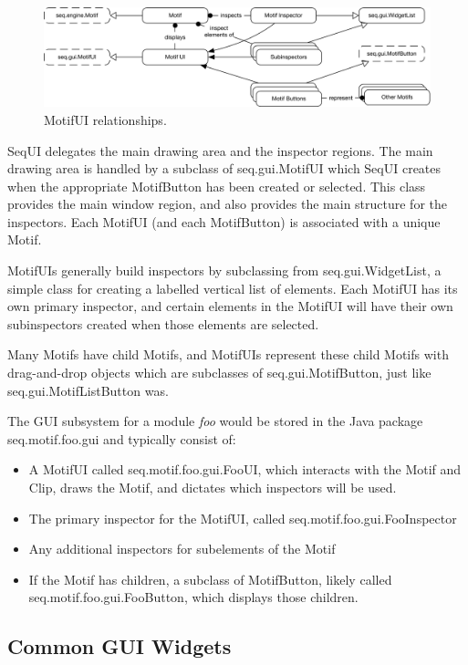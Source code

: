 \documentclass[twoside,10pt]{article}
\begin{document}
\begin{figure}[t]
\centering
\includegraphics[width=5in]{inspectors}
\caption{MotifUI relationships.}
\label{inspectorsdev}
\end{figure}

SeqUI delegates the main drawing area and the inspector regions.  The main drawing area is handled by a subclass of {\sf seq.gui.MotifUI} which SeqUI creates when the appropriate MotifButton has been created or selected.  This class provides the main window region, and also provides the main structure for the inspectors.  Each MotifUI (and each MotifButton) is associated with a unique Motif.

MotifUIs generally build inspectors by subclassing from {\sf seq.gui.WidgetList}, a simple class for creating a labelled vertical list of elements.  Each MotifUI has its own primary inspector, and certain elements in the MotifUI will have their own subinspectors created when those elements are selected. 

Many Motifs have child Motifs, and MotifUIs represent these child Motifs with drag-and-drop objects which are subclasses of {\sf seq.gui.MotifButton}, just like {\sf seq.gui.MotifListButton} was.

The GUI subsystem for a module {\it foo} would be stored in the Java package {\sf seq.motif.foo.gui} and typically consist of:

\begin{itemize}
\item A MotifUI called {\sf seq.motif.foo.gui.FooUI}, which interacts with the Motif and Clip, draws the Motif, and dictates which inspectors will be used.
\item The primary inspector for the MotifUI, called {\sf seq.motif.foo.gui.FooInspector}
\item Any additional inspectors for subelements of the Motif
\item If the Motif has children, a subclass of MotifButton, likely called {\sf seq.motif.foo.gui.FooButton}, which displays those children.
\end{itemize}

\subsection{Common GUI Widgets}
\end{document}
